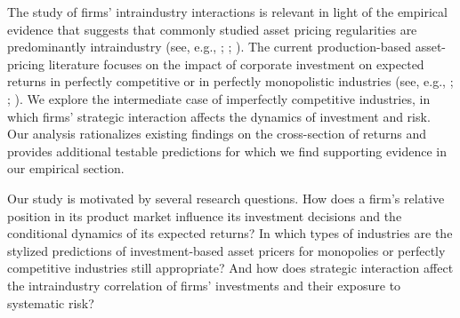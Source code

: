 \documentclass[nogrid,nosurname,sort&compress]{RFS}
\begin{document}
The study of firms' intraindustry interactions is relevant in
light of the empirical evidence that suggests that commonly
studied asset pricing regularities are predominantly intraindustry
(see, e.g., \citealt{cohen1996}; \citealt{mosk}; \citealt{cohen}).
The current production-based asset-pricing literature focuses on
the impact of corporate investment on expected returns in
perfectly competitive or in perfectly monopolistic industries
(see, e.g., \citealt{berk}; \citealt{zhang};
\citealt{carlson2004}). We explore the intermediate case of
imperfectly competitive industries, in which firms' strategic
interaction affects the dynamics of investment and risk. Our
analysis rationalizes existing findings on the cross-section of
returns and provides additional testable predictions for which we
find supporting evidence in our empirical section.

Our study is motivated by several research questions. How does a firm's relative position in its
product market influence its investment decisions and the conditional dynamics of its expected
returns? In which types of industries are the stylized predictions of investment-based asset
pricers for monopolies or perfectly competitive industries still appropriate? And how does
strategic interaction affect the intraindustry correlation of firms' investments and their
exposure to systematic risk?
\end{document}
